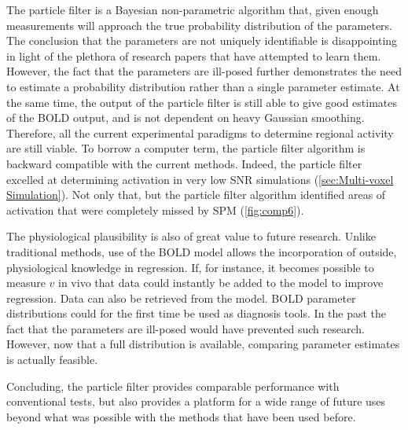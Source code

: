 The particle filter is a Bayesian non-parametric algorithm that, given
enough measurements will approach the true probability distribution
of the parameters. The conclusion that the parameters are not
uniquely identifiable is disappointing in light of the plethora
of research papers that have attempted to learn them. However, the fact
that the parameters are ill-posed further demonstrates
the need to estimate a probability distribution rather than a single
parameter estimate. At the same time, the output of the particle filter
is still able to give good estimates of the BOLD output, and is not
dependent on heavy Gaussian smoothing. Therefore, all the current
experimental paradigms to determine regional activity are still viable.
To borrow a computer term, the particle filter algorithm is backward
compatible with the current methods. Indeed, the particle filter excelled
at determining activation in very low SNR simulations
(\autoref{sec:Multi-voxel Simulation}). Not only that, but the particle
filter algorithm identified areas of activation that were completely
missed by SPM (\autoref{fig:comp6}).

The physiological plausibility is also of great value to future
research. Unlike traditional methods, use of the BOLD model allows
the incorporation of outside, physiological knowledge in regression.
If, for instance, it becomes possible to measure $v$ in vivo that data
could instantly be added to the model to improve regression. Data can
also be retrieved from the model. BOLD parameter distributions could
for the first time be used as diagnosis tools. In the past the fact
that the parameters are
ill-posed would have prevented such research. However, now that a full
distribution is available, comparing parameter estimates is actually
feasible.

Concluding, the particle filter provides comparable performance with
conventional tests, but also provides a platform for a wide range of
future uses beyond what was possible with the methods that have been
used before.

